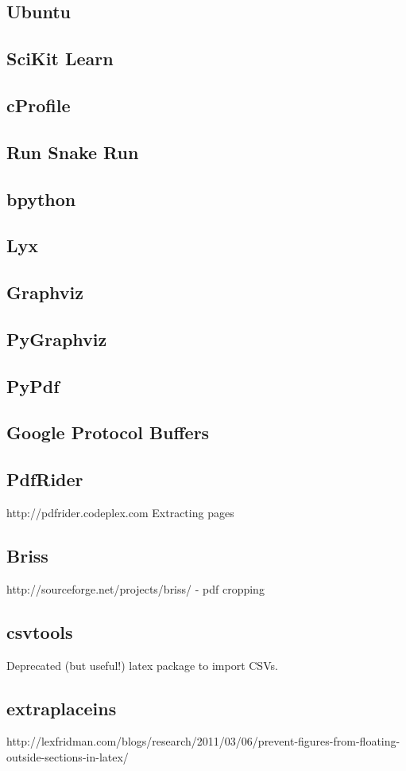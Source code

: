 \documentclass[a4paper,11pt]{report}
\begin{document}
\subsection*{Ubuntu}
\subsection*{SciKit Learn}
\subsection*{cProfile}
\subsection*{Run Snake Run}
\subsection*{bpython}
\subsection*{Lyx}
\subsection*{Graphviz}
\subsection*{PyGraphviz}
\subsection*{PyPdf}
\subsection*{Google Protocol Buffers}
\subsection*{PdfRider}
http://pdfrider.codeplex.com
Extracting pages
\subsection*{Briss}
http://sourceforge.net/projects/briss/ - pdf cropping
\subsection*{csvtools}
Deprecated (but useful!) latex package to import CSVs.

\subsection*{extraplaceins}
http://lexfridman.com/blogs/research/2011/03/06/prevent-figures-from-floating-outside-sections-in-latex/




\end{document}
